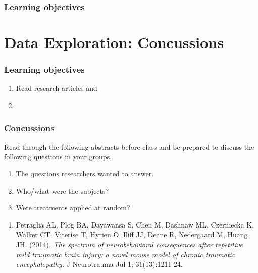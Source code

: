 \documentclass[
]{report}
\providecommand{\tightlist}{%
  \setlength{\itemsep}{0pt}\setlength{\parskip}{0pt}}
\begin{document}

\hypertarget{learning-objectives-22}{%
\subsection{Learning objectives}\label{learning-objectives-22}}

\newpage

\hypertarget{data-exploration-concussions}{%
\chapter{Data Exploration: Concussions}\label{data-exploration-concussions}}


\hypertarget{learning-objectives-23}{%
\subsection{Learning objectives}\label{learning-objectives-23}}

\begin{enumerate}
\def\labelenumi{\arabic{enumi}.}
\item
  Read research articles and
\item
\end{enumerate}

\hypertarget{concussions}{%
\subsection{Concussions}\label{concussions}}

Read through the following abstracts before class and be prepared to discuss the following questions in your groups.

\begin{enumerate}
\def\labelenumi{(\alph{enumi})}
\item
  The questions researchers wanted to answer.
\item
  Who/what were the subjects?
\item
  Were treatments applied at random?
\end{enumerate}

\begin{enumerate}
\def\labelenumi{\arabic{enumi}.}
\tightlist
\item
  Petraglia AL, Plog BA, Dayawansa S, Chen M, Dashnaw ML, Czerniecka K, Walker CT, Viterise T, Hyrien O, Iliff JJ, Deane R, Nedergaard M, Huang JH. (2014). \emph{The spectrum of neurobehavioral consequences after repetitive mild traumatic brain injury: a novel mouse model of chronic traumatic encephalopathy.}
  J Neurotrauma Jul 1; 31(13):1211-24.
\end{enumerate}
\end{document}
